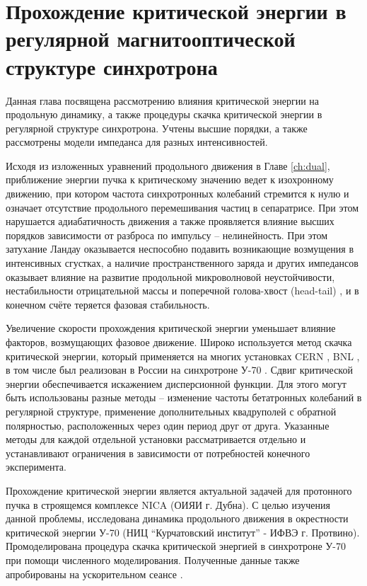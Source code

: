 
	\chapter{Прохождение критической энергии в регулярной магнитооптической структуре синхротрона}\label{ch:transition}

\par Данная глава посвящена рассмотрению влияния критической энергии на продольную динамику, а также процедуры скачка критической энергии в регулярной структуре синхротрона. Учтены высшие порядки, а также рассмотрены модели импеданса для разных интенсивностей.

\par Исходя из изложенных уравнений продольного движения в Главе \ref{ch:dual}, приближение энергии пучка к критическому значению ведет к изохронному движению, при котором частота синхротронных колебаний стремится к нулю и означает отсутствие продольного перемешивания частиц в сепаратрисе. При этом нарушается адиабатичность движения а также проявляется влияние высших порядков зависимости от разброса по импульсу – нелинейность. При этом затухание Ландау оказывается неспособно подавить возникающие возмущения в интенсивных сгустках, а наличие пространственного заряда и других импедансов оказывает влияние на развитие продольной микроволновой неустойчивости, нестабильности отрицательной массы и поперечной голова-хвост (head-tail) \cite{ng}, \cite{MetralMohl} и в конечном счёте теряется фазовая стабильность.

\par Увеличение скорости прохождения критической энергии уменьшает влияние факторов, возмущающих фазовое движение. Широко используется метод скачка критической энергии, который применяется на многих установках CERN \cite{risselada:jump}, BNL \cite{ainsworth:pip}, в том числе был реализован в России на синхротроне У-70 \cite{pashkov:transition}. Сдвиг критической энергии обеспечивается искажением дисперсионной функции. Для этого могут быть использованы разные методы -- изменение частоты бетатронных колебаний в регулярной структуре, применение дополнительных квадруполей с обратной полярностью, расположенных через один период друг от друга. Указанные методы для каждой отдельной установки рассматривается отдельно и устанавливают ограничения в зависимости от потребностей конечного эксперимента.

\par Прохождение критической энергии является актуальной задачей для протонного пучка в строящемся комплексе NICA (ОИЯИ г. Дубна). С целью изучения данной проблемы, исследована динамика продольного движения в окрестности критической энергии У-70 (НИЦ “Курчатовский институт” - ИФВЭ г. Протвино).  Промоделирована процедура скачка критической энергией в синхротроне У-70 при помощи численного моделирования. Полученные данные также апробированы на ускорительном сеансе \cite{Kolokolchikov:2025_U70}.

